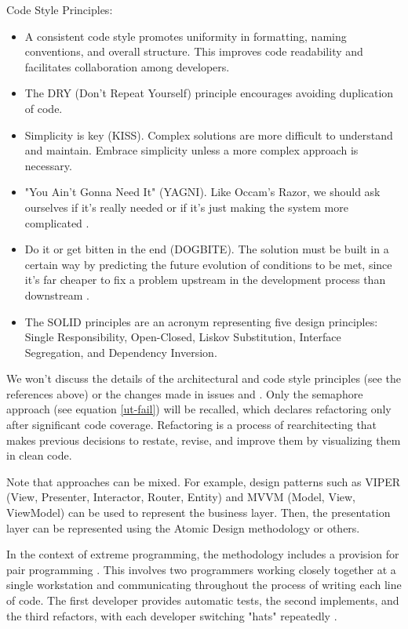 \noindent Code Style Principles:

\begin{itemize}
  \item A consistent code style \cite{Mart22} promotes uniformity in formatting, naming conventions, and overall 
  structure. This improves code readability and facilitates collaboration among developers.

  \item The DRY (Don't Repeat Yourself) principle encourages avoiding duplication of code.

  \item Simplicity is key (KISS). Complex solutions are more difficult to understand and maintain. Embrace simplicity 
  unless a more complex approach is necessary.

  \item "You Ain't Gonna Need It" (YAGNI). Like Occam's Razor, we should ask ourselves if it's really needed or if it's 
  just making the system more complicated \cite{LaiJ23}.

  \item Do it or get bitten in the end (DOGBITE). The solution must be built in a certain way by predicting the future 
  evolution of conditions to be met, since it's far cheaper to fix a problem upstream in the development process than 
  downstream \cite{McCo97}.

  \item The SOLID principles are an acronym representing five design principles: Single Responsibility, Open-Closed, 
  Liskov Substitution, Interface Segregation, and Dependency Inversion.
\end{itemize}

\noindent We won't discuss the details of the architectural and code style principles (see the references above) or the 
changes made in issues  and . Only the semaphore approach (see equation \ref{ut-fail}) will be 
recalled, which declares refactoring only after significant code coverage. Refactoring is a process of rearchitecting 
\cite{Chec23} that makes previous decisions to restate, revise, and improve them by visualizing them in clean code. 

Note that approaches can be mixed. For example, design patterns such as VIPER (View, Presenter, Interactor, Router, 
Entity) and MVVM (Model, View, ViewModel) can be used to represent the business layer. Then, the presentation layer can 
be represented using the Atomic Design \cite{Kama22} methodology or others.

In the context of extreme programming, the methodology includes a provision for pair programming \cite{Ligu19}. This 
involves two programmers working closely together at a single workstation and communicating throughout the process of 
writing each line of code. The first developer provides automatic tests, the second implements, and the third refactors, 
with each developer switching "hats" repeatedly \cite{Bono17}.
